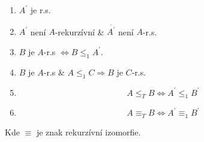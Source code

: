 \begin{theorem}
	\begin{enumerate}
		\item $A^{\prime}$ je r.s.
		\item $A^{\prime}$ není $A$-rekurzívní \& $\overline{A^{\prime}}$ není $A$-r.s.
		\item $B$ je $A$-r.s $\iff B \leq_1 A^{\prime}$.
		\item $B$ je $A$-r.s \& $A \leq_1 C \Rightarrow B$ je $C$-r.s.
		\item \[ A \leq_T B \iff A^{\prime} \leq_1 B^{\prime} \]
		\item \[ A \equiv_T B \iff A^{\prime} \equiv_1 B^{\prime} \]
	\end{enumerate}

	Kde $\equiv$ je znak rekurzívní izomorfie.
\end{theorem}
